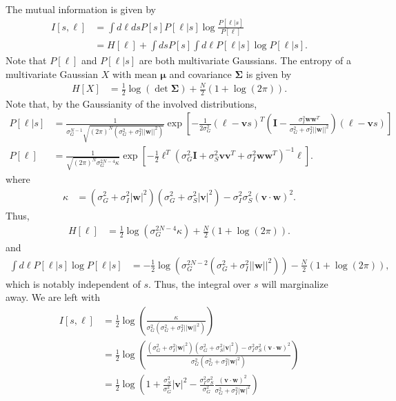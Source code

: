 \documentclass[11pt]{article}
\begin{document}
	The mutual information is given by 
	\begin{align}
		I[s, \boldsymbol{\ell}] &= \int d\boldsymbol{\ell} ds  P[s] P[\boldsymbol{\ell}|s]\log \frac{P[\boldsymbol{\ell}|s]}{P[\boldsymbol{\ell}]} \\
		&= H[\boldsymbol{\ell}] + \int ds P[s] \int d\boldsymbol{\ell} P[\boldsymbol{\ell}|s] \log P[\boldsymbol{\ell}|s].
	\end{align}
	Note that $P[\boldsymbol{\ell}]$ and $P[\boldsymbol{\ell}|s]$ are both multivariate Gaussians. The entropy of a multivariate Gaussian $X$ with mean $\boldsymbol{\mu}$ and covariance $\boldsymbol{\Sigma}$ is given by 
	\begin{align}
		H[X] &= \frac{1}{2} \log \left(\det\boldsymbol{\Sigma}\right) + \frac{N}{2} (1 + \log(2\pi)).
	\end{align}
	Note that, by the Gaussianity of the involved distributions, 
	\begin{align}
		P[\boldsymbol{\ell}|s] &= \frac{1}{\sigma_G^{N-1} \sqrt{(2\pi)^N(\sigma_G^2 + \sigma_I^2 ||\mathbf{w}||^2)}} \exp\left[-\frac{1}{2\sigma_G^2} (\boldsymbol{\ell} - \mathbf{v}s)^T\left(\mathbf{I} - \frac{\sigma_I^2 \mathbf{ww}^T}{\sigma_G^2 + \sigma_I^2 ||\mathbf{w}||^2}\right) (\boldsymbol{\ell} - \mathbf{v}s) \right] \\
		P[\boldsymbol{\ell}] &= \frac{1}{ \sqrt{(2\pi)^N \sigma_G^{2N-4}\kappa}} \exp\left[-\frac{1}{2}\boldsymbol{\ell}^T \left(\sigma_G^2 \mathbf{I} + \sigma_S^2 \mathbf{vv}^T + \sigma_I^2 \mathbf{ww}^T\right)^{-1} \boldsymbol{\ell}\right].
	\end{align}
	where 
	\begin{align}
		\kappa &= (\sigma_G^2 + \sigma_I^2 |\mathbf{w}|^2)(\sigma_G^2 + \sigma_S^2 |\mathbf{v}|^2) - \sigma_I^2 \sigma_S^2 (\mathbf{v}\cdot\mathbf{w})^2.
	\end{align}
	Thus,
	\begin{align}
		H[\boldsymbol{\ell}] &= \frac{1}{2}\log( \sigma_G^{2N-4} \kappa) + \frac{N}{2}(1 + \log(2\pi)).
	\end{align}
	and 
	\begin{align}
		\int d\boldsymbol{\ell} P[\boldsymbol{\ell}|s] \log P[\boldsymbol{\ell}|s] &= -\frac{1}{2}\log(\sigma_G^{2N-2} (\sigma_G^2 +\sigma_I^2 ||\mathbf{w}||^2)) - \frac{N}{2} (1+\log(2\pi)),
	\end{align}
	which is notably independent of $s$. Thus, the integral over $s$ will marginalize away. We are left with
	\begin{align}
		I[s,\boldsymbol{\ell}] &= \frac{1}{2}\log\left(\frac{\kappa}{\sigma_G^2 (\sigma_G^2 + \sigma_I^2 ||\mathbf{w}||^2)}\right) \\
		&= \frac{1}{2} \log \left(\frac{ (\sigma_G^2 + \sigma_I^2 |\mathbf{w}|^2)(\sigma_G^2 + \sigma_S^2 |\mathbf{v}|^2) - \sigma_I^2 \sigma_S^2 (\mathbf{v}\cdot\mathbf{w})^2}{\sigma_G^2 (\sigma_G^2 + \sigma_I^2 |\mathbf{w}|^2)}\right) \\
		&= \frac{1}{2} \log \left(1 + \frac{\sigma_S^2}{\sigma_G^2} |\mathbf{v}|^2 - \frac{\sigma_I^2 \sigma_S^2}{\sigma_G^2} \frac{(\mathbf{v}\cdot\mathbf{w})^2}{\sigma_G^2 + \sigma_I^2 |\mathbf{w}|^2}\right)
	\end{align}
\end{document}
